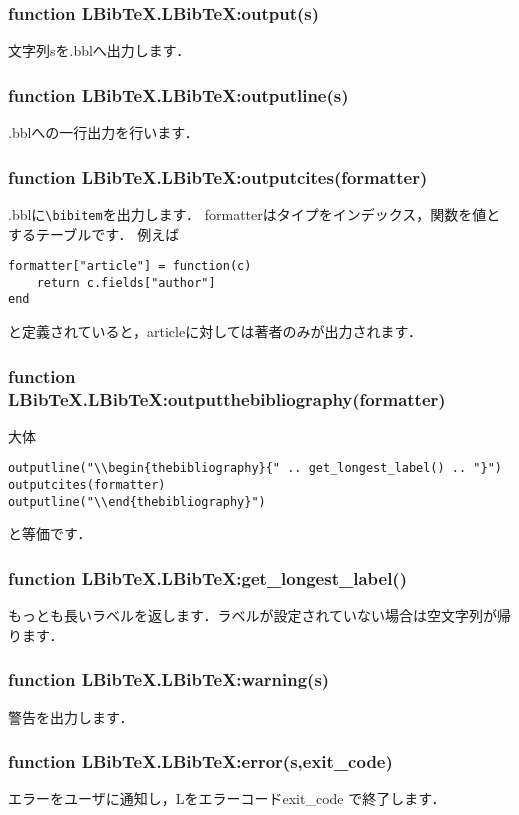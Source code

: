 \documentclass[a4paper]{ltjsarticle}
\DeclareRobustCommand{\LBibTeX}{L\BibTeX}
\begin{document}
\subsubsection{function LBibTeX.LBibTeX:output(s)}
文字列sを.bblへ出力します．

\subsubsection{function LBibTeX.LBibTeX:outputline(s)}
.bblへの一行出力を行います．

\subsubsection{function LBibTeX.LBibTeX:outputcites(formatter)}
.bblに\verb|\bibitem|を出力します．
formatterはタイプをインデックス，関数を値とするテーブルです．
例えば
\begin{lstlisting}
formatter["article"] = function(c)
	return c.fields["author"]
end
\end{lstlisting}
と定義されていると，articleに対しては著者のみが出力されます．

\subsubsection{function LBibTeX.LBibTeX:outputthebibliography(formatter)}
大体
\begin{lstlisting}
outputline("\\begin{thebibliography}{" .. get_longest_label() .. "}")
outputcites(formatter)
outputline("\\end{thebibliography}")
\end{lstlisting}
と等価です．

\subsubsection{function LBibTeX.LBibTeX:get\_longest\_label()}
もっとも長いラベルを返します．ラベルが設定されていない場合は空文字列が帰ります．

\subsubsection{function LBibTeX.LBibTeX:warning(s)}
警告を出力します．

\subsubsection{function LBibTeX.LBibTeX:error(s,exit\_code)}
エラーをユーザに通知し，\LBibTeX をエラーコードexit\_code で終了します．
\end{document}
